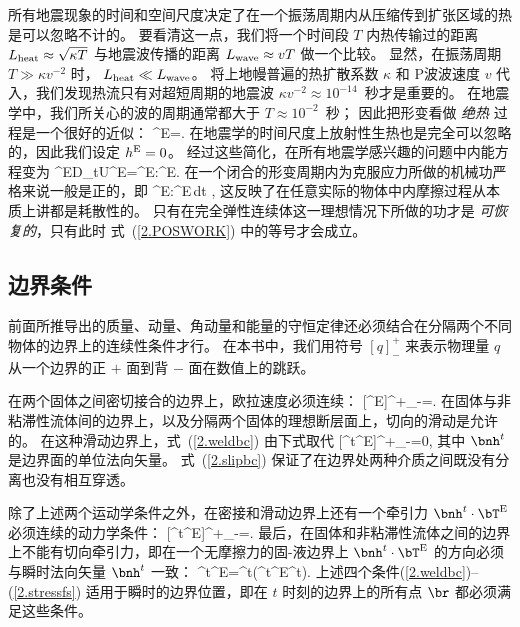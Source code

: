 所有地震现象的时间和空间尺度决定了在一个振荡周期内从压缩传到扩张区域的热是可以忽略不计的。
要看清这一点，我们将一个时间段 $T$ 内热传输过的距离 $L_{\rm heat}\approx\sqrt{\kappa T}$
与地震波传播的距离
$L_{\rm wave}\approx vT$ 做一个比较。
显然，在振荡周期 $T\gg \kappa v^{-2}$ 时，
$L_{\rm heat}\ll L_{\rm wave}$。
将上地幔普遍的热扩散系数 $\kappa$ 和 P波波速度 $v$ 代入，我们发现热流只有对超短周期的地震波
$\kappa v^{-2}\approx 10^{-14}$~秒才是重要的。
在地震学中，我们所关心的波的周期通常都大于
$T\approx 10^{-2}$~秒；
因此把形变看做 {\em 绝热\/}
过程是一个很好的近似：
%
%
\eq \label{2.noheat}
\bH^{\rm E}=\bzero.
\en
在地震学的时间尺度上放射性生热也是完全可以忽略的，因此我们设定 $h^{\rm E}=0$。 经过这些简化，在所有地震学感兴趣的问题中内能方程变为
\eq
\label{2.inteneqn2}
\rho^{\rm E}D_tU^{\rm E}=\bT^{\rm E}\!:\!\bD^{\rm E}.
\en
在一个闭合的形变周期内为克服应力所做的机械功严格来说一般是正的，即
\eq
\label{2.POSWORK}
\oint \bT^{\rm E}\!:\!\bD^{\rm E}\,dt ,
\en
这反映了在任意实际的物体中内摩擦过程从本质上讲都是耗散性的。
只有在完全弹性连续体这一理想情况下所做的功才是
{\em 可恢复的\/}，只有此时
%
%
式~(\ref{2.POSWORK}) 中的等号才会成立。
%
%

\subsection{边界条件}
%

前面所推导出的质量、动量、角动量和能量的守恒定律还必须结合在分隔两个不同物体的边界上的连续性条件才行。
在本书中，我们用符号 $[q]^+_-$ 来表示物理量 $q$ 从一个边界的正 $+$ 面到背 $-$ 面在数值上的跳跃。

在两个固体之间密切接合的边界上，欧拉速度必须连续：
\eq
\label{2.weldbc}
[\bu^{\rm E}]^+_-=\bzero.
\en
在固体与非粘滞性流体间的边界上，以及分隔两个固体的理想断层面上，切向的滑动是允许的。
在这种滑动边界上，式~(\ref{2.weldbc}) 由下式取代
\eq
\label{2.slipbc}
[\bnh^t\cdot\bu^{\rm E}]^+_-=0,
\en
其中 $\bnh^t$ 是边界面的单位法向矢量。
式~(\ref{2.slipbc}) 保证了在边界处两种介质之间既没有分离也没有相互穿透。

除了上述两个运动学条件之外，在密接和滑动边界上还有一个牵引力 $\bnh^t\cdot\bT^{\rm E}$ 必须连续的动力学条件：
\eq
\label{2.stressbc}
[\bnh^t\cdot\bT^{\rm E}]^+_-=\bzero.
\en
最后，在固体和非粘滞性流体之间的边界上不能有切向牵引力，即在一个无摩擦力的固-液边界上
$\bnh^t\cdot\bT^{\rm E}$ 的方向必须与瞬时法向矢量
$\bnh^t$
一致：
\eq
\label{2.stressfs}
\bnh^t\cdot\bT^{\rm E}=\bnh^t(\bnh^t\cdot\bT^{\rm E}\cdot\bnh^t).
\en
上述四个条件(\ref{2.weldbc})--(\ref{2.stressfs})
适用于瞬时的边界位置，即在 $t$ 时刻的边界上的所有点
$\br$ 都必须满足这些条件。
%
%
%

